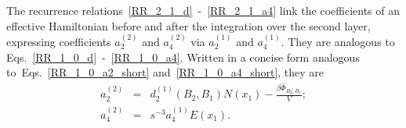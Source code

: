 The recurrence relations~\eqref{RR_2_1_d}~-~\eqref{RR_2_1_a4} link the coefficients of an effective Hamiltonian before and after the integration over the second layer, expressing coefficients $a_2^{(2)}$ and $a_4^{(2)}$ via $a_2^{(1)}$ and $a_4^{(1)}$. They are analogous to Eqs.~\eqref{RR_1_0_d}~-~\eqref{RR_1_0_a4}. Written in a concise form analogous to~Eqs.~\eqref{RR_1_0_a2_short} and~\eqref{RR_1_0_a4_short}, they are
\begin{eqnarray}
	a_2^{(2)} & = & d_2^{(1)}(B_2, B_1) N(x_1) - \frac{\beta\hat{\Phi}_{B_2, B_1}}{V};
	\\
	a_4^{(2)} & = & s^{-3} a_4^{(1)} E(x_1).
\end{eqnarray}
